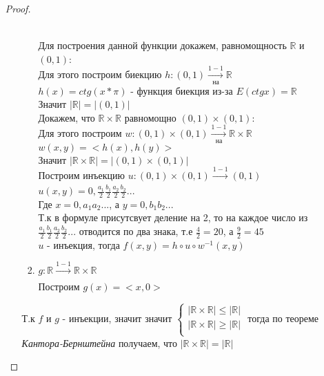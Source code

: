 \documentclass[a4paper]{article}
\theoremstyle{definition}
\begin{document}
\begin{enumerate}
\begin{proof}
\begin{itemize}
\begin{enumerate}
                      \\Для построения данной функции докажем, равномощность $\mathbb{R}$ и $(0,1)$:\\
                      Для этого построим биекцию $h: (0,1) \xrightarrow[\text{на}]{1-1} \mathbb{R}$
                      \\ $h(x) = ctg(x*\pi)$ - функция биекция из-за $E(ctg x) = \mathbb{R}$\\
                      Значит $|\mathbb{R}| = |(0,1)|$
                      \\Докажем, что $\mathbb{R}\times{\mathbb{R}}$ равномощно $(0,1)\times(0,1)$:
                      \\ Для этого построим $w: (0,1)\times(0,1)\xrightarrow[\text{на}]{1-1} \mathbb{R}\times{\mathbb{R}}$
                      \\ $w(x,y)=<h(x), h(y)>$\\
                      Значит $|\mathbb{R}\times{\mathbb{R}}| = |(0,1)\times(0,1)|$
                      \\ Построим инъекцию $u: (0,1)\times(0,1)\xrightarrow[]{1-1}(0,1)$
                      \\$u(x,y)=0,\frac{a_1}{2}\frac{b_1}{2}\frac{a_2}{2}\frac{b_2}{2}...$\\
                       Где $x = 0,a_{1}a_{2}...$, а $y=0,b_{1}b_{2}...$
                       \\ Т.к в формуле присутсвует деление на 2, то на каждое число из $\frac{a_1}{2}\frac{b_1}{2}\frac{a_2}{2}\frac{b_2}{2}...$ отводится по два знака, т.е $\frac{4}{2} = 20$, а $\frac{9}{2}=45$
                       \\ $u$ - инъекция, тогда $f(x,y)=h\circ{u}\circ{w^{-1}}(x,y)$
                \item $g: \mathbb{R}\xrightarrow[]{1-1}{\mathbb{R}\times{\mathbb{R}}}$
                      \\ Построим $g(x) = <x,0>$
               \end{enumerate}
               Т.к $f$ и $g$ - инъекции, значит значит $\left\{
                \begin{matrix}
                 |\mathbb {R} \times{\mathbb{R}|} \leq |\mathbb {R}| \\
                 |\mathbb {R} \times{\mathbb{R}|} \geq |\mathbb {R}| \\
                \end{matrix}
                \right.$
               тогда по теореме \textit{Кантора-Бернштейна} получаем, что $|\mathbb {R} \times{\mathbb{R}|} = |\mathbb {R}|$

\end{itemize}
\end{proof}
\end{enumerate}
\end{document}
